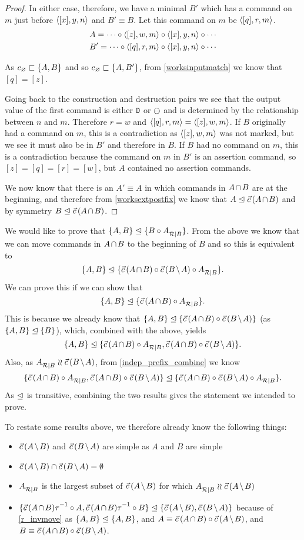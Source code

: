 \begin{proof}
In either case, therefore,
we have a minimal $B'$ which has a command on $m$ just before $\langle{[x],y,n}\rangle$ and $B'\equiv B$.
Let this command on $m$ be $\langle{[q],r,m}\rangle$.
\begin{gather*}
A = \cdots\circ  \langle{[z],w,m}\rangle\circ  \langle{[x],y,n}\rangle\circ  \cdots \\
B' = \cdots\circ  \langle{[q],r,m}\rangle\circ  \langle{[x],y,n}\rangle\circ  \cdots
\end{gather*}

As $c_\varnothing\sqsubset{\{{A,B}\}}$ and so $c_\varnothing\sqsubset{\{{A,B'}\}}$, 
from \cref{worksinputmatch}
we know that $[q]=[z]$. 

Going back to the construction and destruction pairs we see that the output value of the first command
is either $\mathtt{D}$ or $\ominus$ and is determined by the relationship between $n$ and $m$.
Therefore $r=w$ and $\langle{[q],r,m}\rangle=\langle{[z],w,m}\rangle$.
If $B$ originally had a command on $m$,
this is a contradiction as $\langle{[z],w,m}\rangle$ was not marked, but we see it must also be in $B'$ and therefore in $B$.
If $B$ had no command on $m$,
this is a contradiction because the command on $m$ in $B'$ is an assertion command, so $[z]=[q]=[r]=[w]$, 
but $A$ contained no assertion commands.

We now know that there is an $A'\equiv A$ in which commands in $\acbnp$
are at the beginning, and therefore 
from \cref{worksextpostfix} we know that
$\worksm{A}{\acb}$ and by symmetry $\worksm{B}{\acb}$.
\end{proof}

\bigskip


\noindent
We would like to prove that ${\{{A,B}\}}\trianglelefteq{\{{B\circ{A}^{}_{\mathcal{R}|{B}}}\}}$.
From the above we know that we can move commands in $\acbnp$
to the beginning of $B$ and so this is equivalent to
\[ \worksmbb{A,B}{\acb\cc \bma\cc \reca}. \]
We can prove this if we can show that
\[ \worksmbb{A,B}{\acb\cc \reca}. \]
This is because we already know
that $\worksmbb{A,B}{\acb\cc \bma}$ (as ${\{{A,B}\}}\trianglelefteq{\{{B}\}}$),
which, combined with the above, yields
\[ \worksmbb{A,B}{\acb\cc \reca, \acb\cc \bma}. \]
Also, as $\reca\indep\bma$,
from \cref{indep_prefix_combine}
we know
\[ \worksmbb{\acb\cc \reca, \acb\cc \bma}{\acb\cc \bma\cc \reca}. \]
As $\trianglelefteq$ is transitive, combining the two results
gives the statement we intended to prove.


To restate some results above, we therefore already know the following things:
\begin{itemize}
\item $\amb$ and $\bma$ are simple as $A$ and $B$ are simple
\item $\amb \cap \bma = \emptyset$
\item ${A}^{}_{\mathcal{R}|{B}}$ is the largest subset of $\amb$ for which $\reca\indep\amb$
\item $\worksmbb{\acbi\cc A,\acbi\cc B}{\amb, \bma}$ 
because of \cref{r_invmove}
as ${\{{A,B}\}}\trianglelefteq{\{{A,B}\}}$,
and $A\equiv\acb\cc\amb$, and $B\equiv\acb\cc\bma$.
\end{itemize}

